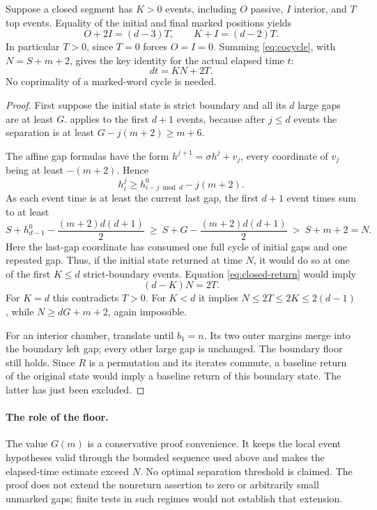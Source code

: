 Suppose a closed segment has $K>0$ events, including $O$ passive, $I$ interior, and $T$ top events. Equality of the initial and final marked positions yields
\[
 O+2I=(d-3)T,\qquad K+I=(d-2)T.
\]
In particular $T>0$, since $T=0$ forces $O=I=0$. Summing \eqref{eq:cocycle}, with $N=S+m+2$, gives the key identity for the actual elapsed time $t$:
\begin{equation}\label{eq:closed-return}
 dt=KN+2T.
\end{equation}
No coprimality of a marked-word cycle is needed.

\begin{proof}
First suppose the initial state is strict boundary and all its $d$ large gaps are at least $G$.  applies to the first $d+1$ events, because after $j\le d$ events the separation is at least $G-j(m+2)\ge m+6$.

The affine gap formulas have the form $h^{j+1}=\sigma h^j+v_j$, every coordinate of $v_j$ being at least $-(m+2)$. Hence
\[
 h_i^j\ge h^0_{i-j\bmod d}-j(m+2).
\]
As each event time is at least the current last gap, the first $d+1$ event times sum to at least
\[
 S+h^0_{d-1}-\frac{(m+2)d(d+1)}2
 \ \ge\ S+G-\frac{(m+2)d(d+1)}2\ >\ S+m+2=N.
\]
Here the last-gap coordinate has consumed one full cycle of initial gaps and one repeated gap. Thus, if the initial state returned at time $N$, it would do so at one of the first $K\le d$ strict-boundary events. Equation \eqref{eq:closed-return} would imply
\[
 (d-K)N=2T.
\]
For $K=d$ this contradicts $T>0$. For $K<d$ it implies $N\le2T\le2K\le2(d-1)$, while $N\ge dG+m+2$, again impossible.

For an interior chamber, translate until $b_1=n$. Its two outer margins merge into the boundary left gap; every other large gap is unchanged. The boundary floor still holds. Since $R$ is a permutation and its iterates commute, a baseline return of the original state would imply a baseline return of this boundary state. The latter has just been excluded.
\end{proof}

\paragraph{The role of the floor.}
The value $G(m)$ is a conservative proof convenience. It keeps the local event hypotheses valid through the bounded sequence used above and makes the elapsed-time estimate exceed $N$. No optimal separation threshold is claimed. The proof does not extend the nonreturn assertion to zero or arbitrarily small unmarked gaps; finite tests in such regimes would not establish that extension.
